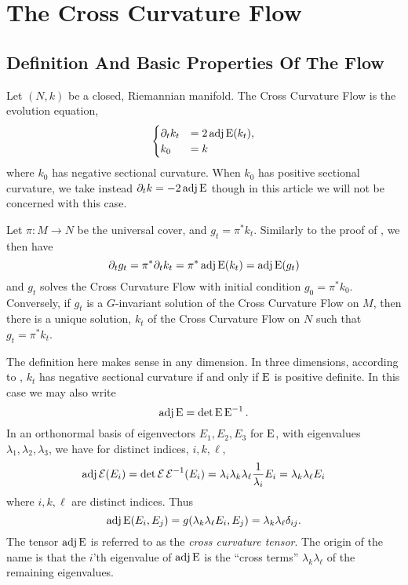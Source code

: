 \documentclass[a4paper, 12pt]{amsart}
\begin{document}
\section{The Cross Curvature Flow}
\label{sec:xcf}
\subsection{Definition And Basic Properties Of  The Flow}
\label{subsec:xcf_defn}

Let \((N, k)\) be a closed, Riemannian manifold. The Cross Curvature Flow is the evolution equation,
\begin{equation}
\label{eq:xcf}
\begin{cases}
\partial_t k_t  &= 2 \operatorname{adj}\operatorname{E}(k_t), \\
k_0 &= k
\end{cases}
\end{equation}
where \(k_0\) has negative sectional curvature. When \(k_0\) has positive sectional curvature, we take instead \(\partial_t k = -2\operatorname{adj}\operatorname{E}\) though in this article we will not be concerned with this case.
\begin{rem}
Let \(\pi : M \to N\) be the universal cover, and \(g_t = \pi^{\ast} k_t\). Similarly to the proof of , we then have
\[
\partial_t g_t = \pi^{\ast} \partial_t k_t = \pi^{\ast} \operatorname{adj}\operatorname{E}(k_t) = \operatorname{adj}\operatorname{E}(g_t)
\]
and \(g_t\) solves the Cross Curvature Flow with initial condition \(g_0 = \pi^{\ast} k_0\). Conversely, if \(g_t\) is a \(G\)-invariant solution of the Cross Curvature Flow on \(M\), then there is a unique solution, \(k_t\) of the Cross Curvature Flow on \(N\) such that \(g_t = \pi^{\ast} k_t\).
\end{rem}

The definition here makes sense in any dimension. In three dimensions, according to , \(k_t\) has negative sectional curvature if and only if \(\operatorname{E}\) is positive definite. In this case we may also write
\[
\operatorname{adj}\operatorname{E} = \det \operatorname{E} \operatorname{E}^{-1}.
\]
In an orthonormal basis of eigenvectors \(E_1, E_2, E_3\) for \(\operatorname{E}\), with eigenvalues \(\lambda_1, \lambda_2, \lambda_3\), we have for distinct indices, \(i, k, \ell\),
\[
\operatorname{adj}\operatorname{\mathcal{E}} (E_i) = \det\operatorname{\mathcal{E}} \operatorname{\mathcal{E}}^{-1}(E_i) = \lambda_i \lambda_k \lambda_{\ell} \frac{1}{\lambda_i} E_i = \lambda_k \lambda_{\ell} E_i
\]
where \(i,k,\ell\) are distinct indices. Thus
\[
\operatorname{adj}\operatorname{E}(E_i, E_j) = g(\lambda_k \lambda_{\ell} E_i, E_j) = \lambda_k \lambda_{\ell} \delta_{ij}.
\]
The tensor \(\operatorname{adj}\operatorname{E}\) is referred to as the \emph{cross curvature tensor}. The origin of the name is that the \(i\)'th eigenvalue of \(\operatorname{adj}\operatorname{E}\) is the ``cross terms'' \(\lambda_k \lambda_{\ell}\) of the remaining eigenvalues.
\end{document}
